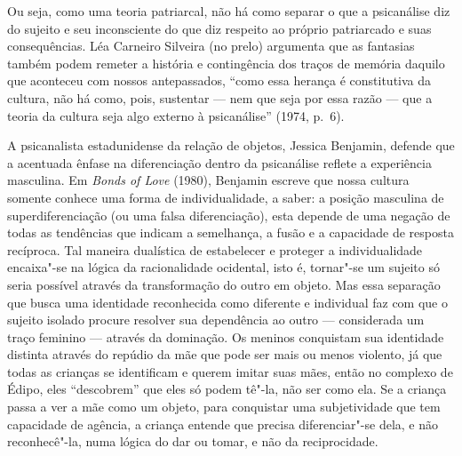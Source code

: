 Ou seja, como uma teoria patriarcal, não há como separar o que a
psicanálise diz do sujeito e seu inconsciente do que diz respeito ao
próprio patriarcado e suas consequências. Léa Carneiro Silveira (no
prelo) argumenta que as fantasias também podem remeter a história e
contingência dos traços de memória daquilo que aconteceu com nossos
antepassados, ``como essa herança é constitutiva da cultura, não há como,
pois, sustentar --- nem que seja por essa razão --- que a teoria da
cultura seja algo externo à psicanálise'' (1974, p.~6).

A psicanalista estadunidense da relação de objetos, Jessica Benjamin,
defende que a acentuada ênfase na diferenciação dentro da psicanálise
reflete a experiência masculina. Em \emph{Bonds of Love} (1980),
Benjamin escreve que nossa cultura somente conhece uma forma de
individualidade, a saber: a posição masculina de superdiferenciação (ou
uma falsa diferenciação), esta depende de uma negação de todas as
tendências que indicam a semelhança, a fusão e a capacidade de resposta
recíproca. Tal maneira dualística de estabelecer e proteger a
individualidade encaixa"-se na lógica da racionalidade ocidental, isto é,
tornar"-se um sujeito só seria possível através da transformação do outro
em objeto. Mas essa separação que busca uma identidade reconhecida como
diferente e individual faz com que o sujeito isolado procure resolver
sua dependência ao outro --- considerada um traço feminino --- através
da dominação. Os meninos conquistam sua identidade distinta através do
repúdio da mãe que pode ser mais ou menos violento, já que todas as
crianças se identificam e querem imitar suas mães, então no complexo de
Édipo, eles ``descobrem'' que eles só podem tê"-la, não ser como ela. Se
a criança passa a ver a mãe como um objeto, para conquistar uma
subjetividade que tem capacidade de agência, a criança entende que
precisa diferenciar"-se dela, e não reconhecê"-la, numa lógica do dar ou
tomar, e não da reciprocidade.

